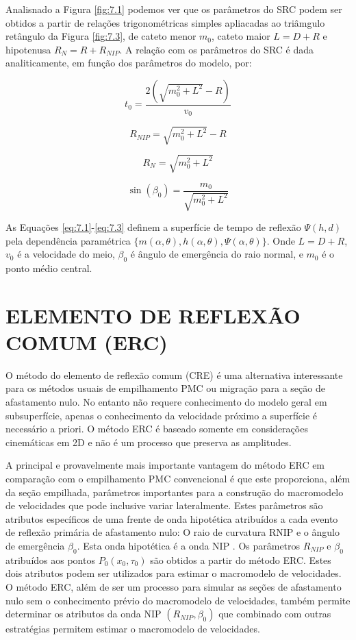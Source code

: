 Analisnado a Figura \ref{fig:7.1} podemos ver que os parâmetros do SRC podem ser obtidos a partir
de relações trigonométricas simples apliacadas ao triâmgulo retângulo da Figura \ref{fig:7.3}, de cateto menor
$m_0$, cateto maior $L=D+R$ e hipotenusa $R_N=R+R_{NIP}$.
A relação com os parâmetros do SRC é dada analiticamente, em função dos parâmetros do modelo, por:

\begin{equation}
\label{eq:7.4}
t_0=\frac{2(\sqrt{m_0^2+L^2}-R)}{v_0}
\end{equation}

\begin{equation}
\label{eq:7.5}
R_{NIP}=\sqrt{m_0^2+L^2}-R
\end{equation}

\begin{equation}
\label{eq:7.6}
R_N =\sqrt{m_0^2+L^2}
\end{equation}

\begin{equation}
\label{eq:7.7}
\sin(\beta_0)=\frac{m_0}{\sqrt{m_0^2+L^2}}
\end{equation}


As Equações \ref{eq:7.1}-\ref{eq:7.3} definem a superfície de tempo de reflexão $\Psi(h,d)$ pela dependência paramétrica
$\{m(\alpha,\theta),h(\alpha,\theta),\Psi(\alpha,\theta)\}$.
Onde $L=D+R$, $v_0$ é a velocidade do meio, $\beta_0$ é ângulo de emergência
do raio normal, e $m_0$ é o ponto médio central.


\section{ELEMENTO DE REFLEXÃO COMUM (ERC)}

O método do elemento de reflexão comum (CRE) é uma alternativa interessante para os métodos usuais de empilhamento PMC ou
migração para a seção de afastamento nulo. No entanto não requere conhecimento do modelo geral em subsuperfície, apenas
o conhecimento da velocidade próximo a superfície é necessário a priori.
O método ERC é baseado somente em considerações cinemáticas em 2D e não é
um processo que preserva as amplitudes.

A principal e provavelmente mais importante vantagem do método ERC em comparação com o empilhamento PMC convencional
é que este proporciona, além da seção empilhada, parâmetros importantes para a construção do macromodelo de 
velocidades que pode inclusive variar lateralmente.
Estes parâmetros são atributos específicos de uma frente de onda hipotética atribuídos a cada evento de reflexão
primária de afastamento nulo: O raio de curvatura RNIP e o ângulo de emergência $\beta_0$. Esta onda hipotética é
a onda NIP \cite{hubral}.
Os parâmetros $R_{NIP}$ e $\beta_0$ atribuídos aos pontos $P_0(x_0,\tau_0)$ são obtidos a partir do método ERC.
Estes dois atributos podem ser utilizados para estimar o macromodelo de velocidades.
O método ERC, além de ser um processo para simular as seções de afastamento nulo sem o conhecimento prévio
do macromodelo de velocidades, também permite determinar os atributos da onda NIP $(R_{NIP},\beta_0)$
que combinado com outras estratégias permitem estimar o macromodelo de velocidades.

